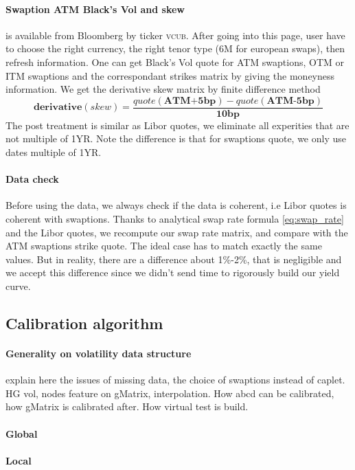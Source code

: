 \documentclass[a4paper,10pt]{article}
\newcommand{\bl}[1]{{\scshape  #1}}
\begin{document}
\paragraph{Swaption ATM Black's Vol and skew} is available from Bloomberg by ticker \bl{vcub}. After going into this page, user have to choose the right currency, the right tenor type (6M for european swaps), then refresh information. One can get Black's Vol quote for ATM swaptions, OTM or ITM swaptions and the correspondant strikes matrix by giving the moneyness information. We get the derivative skew matrix by finite difference method
\[
\textbf{derivative}(skew) = \frac{quote (\textbf{ATM+5bp}) - quote(\textbf{ATM-5bp}) }{\textbf{10bp}}
\]
The post treatment is similar as Libor quotes, we eliminate all experities that are not multiple of 1YR. Note the difference is that for swaptions quote, we only use dates multiple of 1YR. 
\paragraph{Data check}
Before using the data, we always check if the data is coherent, i.e Libor quotes is coherent with swaptions. Thanks to analytical swap rate formula \ref{eq:swap_rate} and the Libor quotes, we recompute our swap rate matrix, and compare with the ATM swaptions strike quote. The ideal case has to match exactly the same values. But in reality, there are a difference about 1\%-2\%, that is negligible and we accept this difference since we didn't send time to rigorously build our yield curve.    
\subsection{Calibration algorithm}
\paragraph{Generality on volatility data structure}







explain here the issues of missing data, the choice of swaptions instead of caplet. HG vol, nodes feature on gMatrix, interpolation. How abcd can be calibrated, how gMatrix is calibrated after. How virtual test is build.
\paragraph{Global}
\paragraph{Local}
\end{document}
